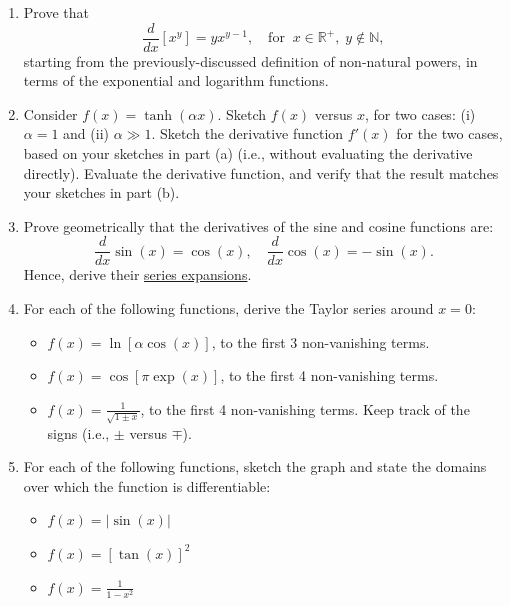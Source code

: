 \documentclass[10pt,a4paper]{article}
\begin{document}
\begin{enumerate}
\item 
  Prove that
  \begin{equation}
\frac{d}{dx} [x^y] = y x^{y-1}, \quad\mathrm{for}\;\;x \in \mathbb{R}^+, \; y \notin \mathbb{N},
  \end{equation}
  starting from the previously-discussed definition of non-natural
  powers, in terms of the exponential and logarithm functions.

\item
  Consider $f(x) = \tanh(\alpha x)$.  Sketch $f(x)$ versus $x$, for
  two cases: (i) $\alpha = 1$ and (ii) $\alpha \gg 1$.  Sketch the
  derivative function $f'(x)$ for the two cases, based on your
  sketches in part (a) (i.e., without evaluating the derivative
  directly).  Evaluate the derivative function, and verify that the
  result matches your sketches in part (b).

\item
  Prove geometrically that the derivatives of the sine and cosine
  functions are:
  \begin{equation} \frac{d}{dx}\sin(x) = \cos(x),
    \quad\frac{d}{dx}\cos(x) = -\sin(x).
  \end{equation}
  Hence, derive their \hyperref[series]{series expansions}.

\item
  For each of the following functions, derive the Taylor series around
  $x = 0$:
  \begin{itemize}
  \item 
    $f(x) = \ln\left[\alpha \cos(x)\right]$, to the first 3 non-vanishing terms.
  \item
    $f(x) = \cos\left[\pi\exp(x)\right]$, to the first 4 non-vanishing terms.
  \item
    $\displaystyle f(x) = \frac{1}{\sqrt{1 \pm x}}$, to the first 4 non-vanishing terms.  Keep track of the signs (i.e., $\pm$ versus $\mp$).
  \end{itemize}
  
\item
For each of the following functions, sketch the graph and state the
domains over which the function is differentiable:
\begin{itemize}
\item $\displaystyle f(x) = |\sin(x)|$
\item $\displaystyle f(x) = \left[\tan(x)\right]^2$
\item $\displaystyle f(x) = \frac{1}{1-x^2}$
\end{itemize}


\end{enumerate}
\end{document}
